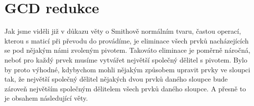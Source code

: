 \section{GCD redukce}
Jak jsme viděli již v důkazu věty o Smithově normálním tvaru, častou operací,
kterou s maticí při převodu do \snf provádíme, je eliminace všech prvků
nacházejících se pod nějakým námi zvoleným pivotem. Takováto eliminace je poměrně
náročná, neboť pro každý prvek musíme vytvářet největší společný dělitel s pivotem.
Bylo by proto výhodné, kdybychom mohli nějakým způsobem upravit prvky ve sloupci tak,
že největší společný dělitel nějakých dvou prvků daného sloupce bude zároveň největším
společným dělitelem všech prvků daného sloupce. A přesně to je obsahem následující věty.

